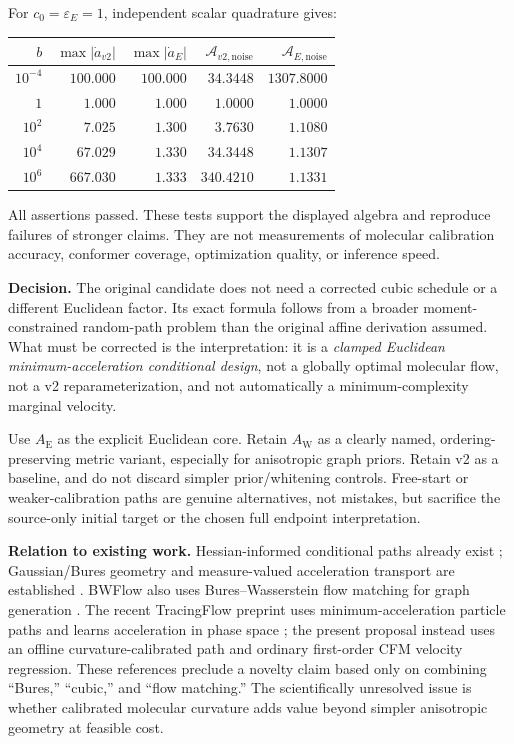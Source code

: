\documentclass[11pt,letterpaper]{article}
\newcommand{\epsE}{\varepsilon_E}
\newcommand{\AltE}{A_{\mathrm E}}
\newcommand{\AltW}{A_{\mathrm W}}
\begin{document}
For $c_0=\epsE=1$, independent scalar quadrature gives:
\begin{center}\small
\begin{tabular}{rrrrr}
\toprule
$b$ & $\max|\dot a_{v2}|$ & $\max|\dot a_E|$ & $\mathcal A_{v2,\mathrm{noise}}$ & $\mathcal A_{E,\mathrm{noise}}$\\\midrule
$10^{-4}$ & $100.000$ & $100.000$ & $34.3448$ & $1307.8000$\\
$1$ & $1.000$ & $1.000$ & $1.0000$ & $1.0000$\\
$10^2$ & $7.025$ & $1.300$ & $3.7630$ & $1.1080$\\
$10^4$ & $67.029$ & $1.330$ & $34.3448$ & $1.1307$\\
$10^6$ & $667.030$ & $1.333$ & $340.4210$ & $1.1331$\\
\bottomrule
\end{tabular}
\end{center}
All assertions passed. These tests support the displayed algebra and reproduce failures of stronger claims. They are not measurements of molecular calibration accuracy, conformer coverage, optimization quality, or inference speed.

\textbf{Decision.} The original candidate does not need a corrected cubic schedule or a different Euclidean factor. Its exact formula follows from a broader moment-constrained random-path problem than the original affine derivation assumed. What must be corrected is the interpretation: it is a \emph{clamped Euclidean minimum-acceleration conditional design}, not a globally optimal molecular flow, not a v2 reparameterization, and not automatically a minimum-complexity marginal velocity.

Use $\AltE$ as the explicit Euclidean core. Retain $\AltW$ as a clearly named, ordering-preserving metric variant, especially for anisotropic graph priors. Retain v2 as a baseline, and do not discard simpler prior/whitening controls. Free-start or weaker-calibration paths are genuine alternatives, not mistakes, but sacrifice the source-only initial target or the chosen full endpoint interpretation.

\textbf{Relation to existing work.} Hessian-informed conditional paths already exist \cite{sprague}; Gaussian/Bures geometry and measure-valued acceleration transport are established \cite{bhatia,benamou,chen}. BWFlow also uses Bures--Wasserstein flow matching for graph generation \cite{jiang}. The recent TracingFlow preprint uses minimum-acceleration particle paths and learns acceleration in phase space \cite{sun}; the present proposal instead uses an offline curvature-calibrated path and ordinary first-order CFM velocity regression. These references preclude a novelty claim based only on combining ``Bures,'' ``cubic,'' and ``flow matching.'' The scientifically unresolved issue is whether calibrated molecular curvature adds value beyond simpler anisotropic geometry at feasible cost.
\end{document}
